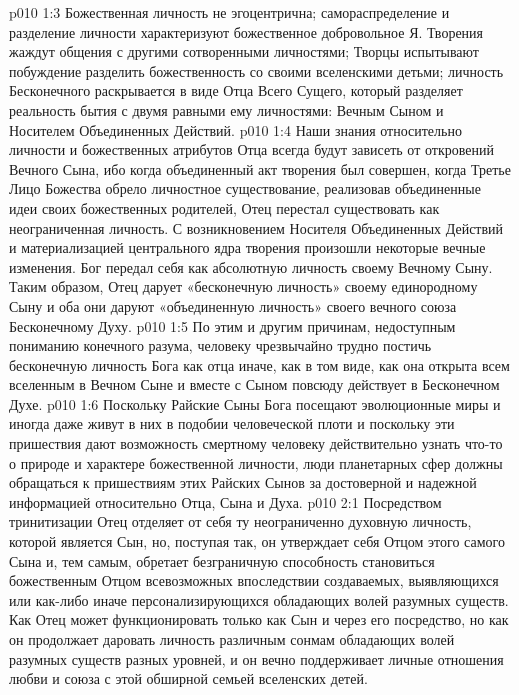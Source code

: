 \vs p010 1:3 \pc Божественная личность не эгоцентрична; самораспределение и разделение личности характеризуют божественное добровольное Я. Творения жаждут общения с другими сотворенными личностями; Творцы испытывают побуждение разделить божественность со своими вселенскими детьми; личность Бесконечного раскрывается в виде Отца Всего Сущего, который разделяет реальность бытия с двумя равными ему личностями: Вечным Сыном и Носителем Объединенных Действий.
\vs p010 1:4 \pc Наши знания относительно личности и божественных атрибутов Отца всегда будут зависеть от откровений Вечного Сына, ибо когда объединенный акт творения был совершен, когда Третье Лицо Божества обрело личностное существование, реализовав объединенные идеи своих божественных родителей, Отец перестал существовать как неограниченная личность. С возникновением Носителя Объединенных Действий и материализацией центрального ядра творения произошли некоторые вечные изменения. Бог передал себя как абсолютную личность своему Вечному Сыну. Таким образом, Отец дарует «бесконечную личность» своему единородному Сыну и оба они даруют «объединенную личность» своего вечного союза Бесконечному Духу.
\vs p010 1:5 По этим и другим причинам, недоступным пониманию конечного разума, человеку чрезвычайно трудно постичь бесконечную личность Бога как отца иначе, как в том виде, как она открыта всем вселенным в Вечном Сыне и вместе с Сыном повсюду действует в Бесконечном Духе.
\vs p010 1:6 Поскольку Райские Сыны Бога посещают эволюционные миры и иногда даже живут в них в подобии человеческой плоти и поскольку эти пришествия дают возможность смертному человеку действительно узнать что\hyp{}то о природе и характере божественной личности, люди планетарных сфер должны обращаться к пришествиям этих Райских Сынов за достоверной и надежной информацией относительно Отца, Сына и Духа.
\vs p010 2:1 Посредством тринитизации Отец отделяет от себя ту неограниченно духовную личность, которой является Сын, но, поступая так, он утверждает себя Отцом этого самого Сына и, тем самым, обретает безграничную способность становиться божественным Отцом всевозможных впоследствии создаваемых, выявляющихся или как\hyp{}либо иначе персонализирующихся обладающих волей разумных существ. Как  Отец может функционировать только как Сын и через его посредство, но как  он продолжает даровать личность различным сонмам обладающих волей разумных существ разных уровней, и он вечно поддерживает личные отношения любви и союза с этой обширной семьей вселенских детей.
